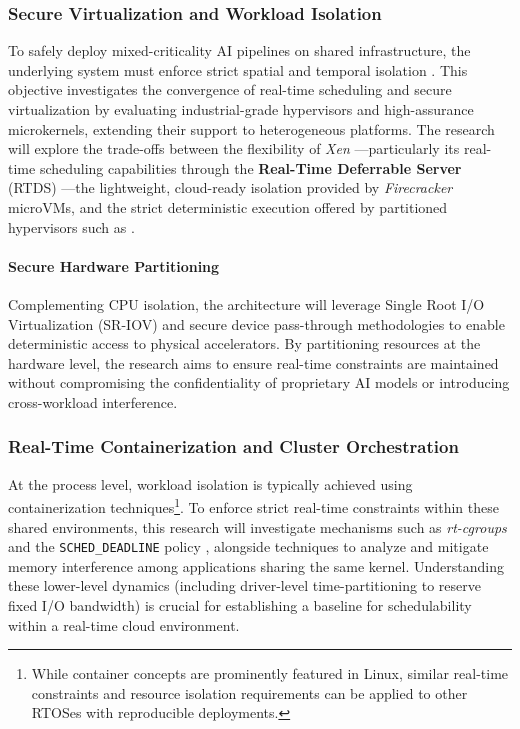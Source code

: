 \documentclass[11pt,a4paper]{article}
\begin{document}
\subsubsection{Secure Virtualization and Workload Isolation}
To safely deploy mixed-criticality AI pipelines on shared infrastructure, the underlying system must enforce strict spatial and temporal isolation \cite{CINQUE2022315}. This objective investigates the convergence of real-time scheduling and secure virtualization by evaluating industrial-grade hypervisors and high-assurance microkernels, extending their support to heterogeneous platforms. The research will explore the trade-offs between the flexibility of \textit{Xen} \cite{barham2003xen}---particularly its real-time scheduling capabilities through the \textbf{Real-Time Deferrable Server} (RTDS) \cite{RTDS}---the lightweight, cloud-ready isolation provided by \textit{Firecracker} \cite{agache2020firecracker} microVMs, and the strict deterministic execution offered by partitioned hypervisors such as  \cite{jailhouse}.

\paragraph{Secure Hardware Partitioning}
Complementing CPU isolation, the architecture will leverage Single Root I/O Virtualization (SR-IOV) \cite{dong2008sr, dong2012high} and secure device pass-through methodologies to enable deterministic access to physical accelerators. By partitioning resources at the hardware level, the research aims to ensure real-time constraints are maintained without compromising the confidentiality of proprietary AI models or introducing cross-workload interference.

\subsubsection{Real-Time Containerization and Cluster Orchestration}
At the process level, workload isolation is typically achieved using containerization techniques\footnote{While container concepts are prominently featured in Linux, similar real-time constraints and resource isolation requirements can be applied to other RTOSes with reproducible deployments.}. To enforce strict real-time constraints within these shared environments, this research will investigate mechanisms such as \textit{rt-cgroups} and the \texttt{SCHED\_DEADLINE} policy \cite{abeni2019container, samimi2025enabling}, alongside techniques to analyze and mitigate memory interference among applications sharing the same kernel. Understanding these lower-level dynamics (including driver-level time-partitioning to reserve fixed I/O bandwidth) is crucial for establishing a baseline for schedulability within a real-time cloud environment.
\end{document}
